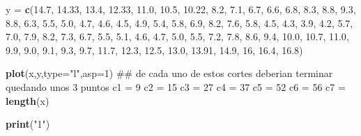 \documentclass[]{article}
\newenvironment{Shaded}{\begin{snugshade}}{\end{snugshade}}
\newcommand{\KeywordTok}[1]{\textcolor[rgb]{0.13,0.29,0.53}{\textbf{#1}}}
\newcommand{\DataTypeTok}[1]{\textcolor[rgb]{0.13,0.29,0.53}{#1}}
\newcommand{\DecValTok}[1]{\textcolor[rgb]{0.00,0.00,0.81}{#1}}
\newcommand{\FloatTok}[1]{\textcolor[rgb]{0.00,0.00,0.81}{#1}}
\newcommand{\StringTok}[1]{\textcolor[rgb]{0.31,0.60,0.02}{#1}}
\newcommand{\NormalTok}[1]{#1}
\begin{document}
\begin{Shaded}
\begin{Highlighting}[]
\NormalTok{y =}\StringTok{ }\KeywordTok{c}\NormalTok{(}\FloatTok{14.7}\NormalTok{, }\FloatTok{14.33}\NormalTok{, }\FloatTok{13.4}\NormalTok{, }\FloatTok{12.33}\NormalTok{, }\FloatTok{11.0}\NormalTok{, }\FloatTok{10.5}\NormalTok{, }\FloatTok{10.22}\NormalTok{, }\FloatTok{8.2}\NormalTok{, }\FloatTok{7.1}\NormalTok{, }\FloatTok{6.7}\NormalTok{, }\FloatTok{6.6}\NormalTok{, }
  \FloatTok{6.8}\NormalTok{, }\FloatTok{8.3}\NormalTok{, }\FloatTok{8.8}\NormalTok{, }\FloatTok{9.3}\NormalTok{, }\FloatTok{8.8}\NormalTok{, }
  \FloatTok{6.3}\NormalTok{, }\FloatTok{5.5}\NormalTok{, }\FloatTok{5.0}\NormalTok{, }\FloatTok{4.7}\NormalTok{, }\FloatTok{4.6}\NormalTok{, }\FloatTok{4.5}\NormalTok{, }\FloatTok{4.9}\NormalTok{, }\FloatTok{5.4}\NormalTok{, }\FloatTok{5.8}\NormalTok{, }\FloatTok{6.9}\NormalTok{, }\FloatTok{8.2}\NormalTok{, }\FloatTok{7.6}\NormalTok{, }
  \FloatTok{5.8}\NormalTok{, }\FloatTok{4.5}\NormalTok{, }\FloatTok{4.3}\NormalTok{, }\FloatTok{3.9}\NormalTok{, }\FloatTok{4.2}\NormalTok{, }\FloatTok{5.7}\NormalTok{, }\FloatTok{7.0}\NormalTok{, }\FloatTok{7.9}\NormalTok{, }\FloatTok{8.2}\NormalTok{, }\FloatTok{7.3}\NormalTok{, }
  \FloatTok{6.7}\NormalTok{, }\FloatTok{5.5}\NormalTok{, }\FloatTok{5.1}\NormalTok{, }\FloatTok{4.6}\NormalTok{, }\FloatTok{4.7}\NormalTok{, }\FloatTok{5.0}\NormalTok{, }\FloatTok{5.5}\NormalTok{, }\FloatTok{7.2}\NormalTok{, }\FloatTok{7.8}\NormalTok{, }\FloatTok{8.6}\NormalTok{, }\FloatTok{9.4}\NormalTok{, }\FloatTok{10.0}\NormalTok{,  }\FloatTok{10.7}\NormalTok{, }\FloatTok{11.0}\NormalTok{, }
  \FloatTok{9.9}\NormalTok{, }\FloatTok{9.0}\NormalTok{, }\FloatTok{9.1}\NormalTok{, }\FloatTok{9.3}\NormalTok{, }\FloatTok{9.7}\NormalTok{, }\FloatTok{11.7}\NormalTok{, }
  \FloatTok{12.3}\NormalTok{, }\FloatTok{12.5}\NormalTok{, }\FloatTok{13.0}\NormalTok{, }\FloatTok{13.91}\NormalTok{, }\FloatTok{14.9}\NormalTok{, }\DecValTok{16}\NormalTok{, }\FloatTok{16.4}\NormalTok{, }\FloatTok{16.8}\NormalTok{)}


\KeywordTok{plot}\NormalTok{(x,y,}\DataTypeTok{type=}\StringTok{"l"}\NormalTok{,}\DataTypeTok{asp=}\DecValTok{1}\NormalTok{)}
\NormalTok{## de cada uno de estos cortes deberian terminar quedando unos 3 puntos }
\NormalTok{c1 =}\StringTok{ }\DecValTok{9}
\NormalTok{c2 =}\StringTok{ }\DecValTok{15}
\NormalTok{c3 =}\StringTok{ }\DecValTok{27}
\NormalTok{c4 =}\StringTok{ }\DecValTok{37}
\NormalTok{c5 =}\StringTok{ }\DecValTok{52}
\NormalTok{c6 =}\StringTok{ }\DecValTok{56}
\NormalTok{c7 =}\StringTok{ }\KeywordTok{length}\NormalTok{(x)}

\KeywordTok{print}\NormalTok{(}\StringTok{"1"}\NormalTok{)}
\end{Highlighting}
\end{Shaded}
\end{document}
